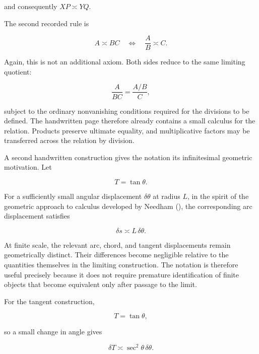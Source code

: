 \documentclass[11pt]{article}
\newcommand{\ulteq}{\mathrel{\text{≍}}}
\begin{document}
and consequently $XP\ulteq YQ$.

The second recorded rule is

\begin{equation}
A\ulteq BC
\quad\Longleftrightarrow\quad
\frac{A}{B}\ulteq C.
\end{equation}

Again, this is not an additional axiom. Both sides reduce to the same limiting quotient:

\begin{equation}
\frac{A}{BC}
=
\frac{A/B}{C},
\end{equation}

subject to the ordinary nonvanishing conditions required for the divisions to be defined. The handwritten page therefore already contains a small calculus for the relation. Products preserve ultimate equality, and multiplicative factors may be transferred across the relation by division.

A second handwritten construction gives the notation its infinitesimal geometric motivation. Let

\begin{equation}
T=\tan\theta.
\end{equation}

For a sufficiently small angular displacement $\delta\theta$ at radius $L$, in the spirit of the geometric approach to calculus developed by Needham (\citeyear{Needham1997,Needham2021}), the corresponding arc displacement satisfies

\begin{equation}
\delta s\ulteq L\,\delta\theta.
\end{equation}

At finite scale, the relevant arc, chord, and tangent displacements remain geometrically distinct. Their differences become negligible relative to the quantities themselves in the limiting construction. The notation is therefore useful precisely because it does not require premature identification of finite objects that become equivalent only after passage to the limit.

For the tangent construction,

\begin{equation}
T=\tan\theta,
\end{equation}

so a small change in angle gives

\begin{equation}
\delta T
\ulteq
\sec^2\theta\,\delta\theta.
\end{equation}
\end{document}
